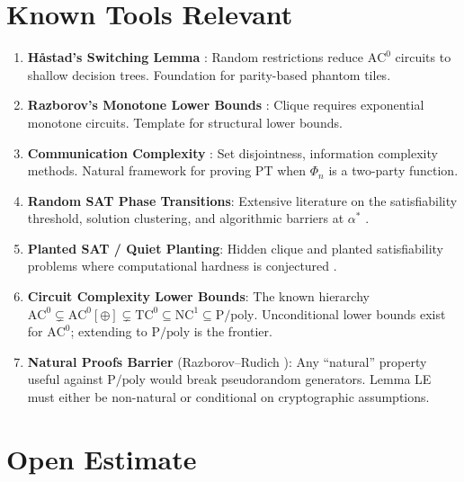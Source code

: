 \documentclass[11pt]{article}
\theoremstyle{definition}
\begin{document}
\section{Known Tools Relevant}

\begin{enumerate}
  \item \textbf{H\aa stad's Switching Lemma} \cite{Hastad}: Random restrictions reduce
    $\mathrm{AC}^0$ circuits to shallow decision trees.  Foundation for parity-based phantom tiles.
  \item \textbf{Razborov's Monotone Lower Bounds} \cite{Raz}: Clique requires exponential
    monotone circuits.  Template for structural lower bounds.
  \item \textbf{Communication Complexity} \cite{Raz2,KN}: Set disjointness, information
    complexity methods.  Natural framework for proving PT when $\Phi_n$ is a two-party function.
  \item \textbf{Random SAT Phase Transitions}: Extensive literature on the satisfiability
    threshold, solution clustering, and algorithmic barriers at $\alpha^*$
    \cite{MPZ,ART}.
  \item \textbf{Planted SAT / Quiet Planting}: Hidden clique and planted satisfiability
    problems where computational hardness is conjectured \cite{planted}.
  \item \textbf{Circuit Complexity Lower Bounds}: The known hierarchy
    $\mathrm{AC}^0 \subsetneq \mathrm{AC}^0[\oplus] \subsetneq \mathrm{TC}^0 \subseteq \mathrm{NC}^1 \subseteq \mathrm{P/poly}$.
    Unconditional lower bounds exist for $\mathrm{AC}^0$; extending to $\mathrm{P/poly}$ is the frontier.
  \item \textbf{Natural Proofs Barrier} (Razborov--Rudich \cite{RR}): Any ``natural'' property
    useful against $\mathrm{P/poly}$ would break pseudorandom generators.
    Lemma LE must either be non-natural or conditional on cryptographic assumptions.
\end{enumerate}

\section{Open Estimate}
\end{document}
